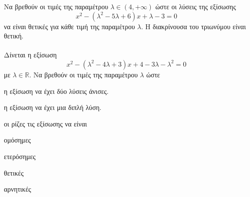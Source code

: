 \documentclass[11pt,a4paper,modern]{FFExercises}
\begin{document}
\askhsh Να βρεθούν οι τιμές της παραμέτρου $ \lambda\in(4,+\infty) $ ώστε οι λύσεις της εξίσωσης  \[ x^2-\left( \lambda^2-5\lambda+6\right) x+\lambda-3=0 \] να είναι θετικές για κάθε τιμή της παραμέτρου $ \lambda $. Η διακρίνουσα του τριωνύμου είναι θετική.\\\\
\askhsh Δίνεται η εξίσωση \[ x^2-\left(\lambda^2-4\lambda+3\right)x+4-3\lambda-\lambda^2=0 \] με $\lambda\in\mathbb{R}$. Να βρεθούν οι τιμές της παραμέτρου $ \lambda $ ώστε
\begin{alist}
\item η εξίσωση να έχει δύο λύσεις άνισες.
\item η εξίσωση να έχει μια διπλή λύση.
\item οι ρίζες τις εξίσωσης να είναι
\begin{rlist}
\item ομόσημες
\item ετερόσημες
\item θετικές
\item αρνητικές
\end{rlist}
\end{alist}
\end{document}
